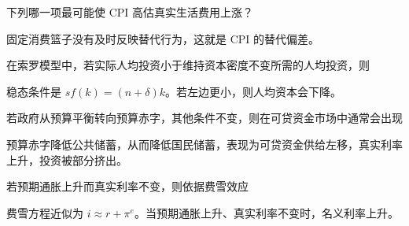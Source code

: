 \begin{question}
下列哪一项最可能使 CPI 高估真实生活费用上涨？
\begin{choiceoptions}[2]
\end{choiceoptions}
\begin{solution}
固定消费篮子没有及时反映替代行为，这就是 CPI 的替代偏差。
\end{solution}
\end{question}

\begin{question}
在索罗模型中，若实际人均投资小于维持资本密度不变所需的人均投资，则
\begin{choiceoptions}[2]
\end{choiceoptions}
\begin{solution}
稳态条件是 $sf(k)=(n+\delta)k$。若左边更小，则人均资本会下降。
\end{solution}
\end{question}

\begin{question}
若政府从预算平衡转向预算赤字，其他条件不变，则在可贷资金市场中通常会出现
\begin{choiceoptions}[2]
\end{choiceoptions}
\begin{solution}
预算赤字降低公共储蓄，从而降低国民储蓄，表现为可贷资金供给左移，真实利率上升，投资被部分挤出。
\end{solution}
\end{question}

\begin{question}
若预期通胀上升而真实利率不变，则依据费雪效应
\begin{choiceoptions}[2]
\end{choiceoptions}
\begin{solution}
费雪方程近似为 $i\approx r+\pi^e$。当预期通胀上升、真实利率不变时，名义利率上升。
\end{solution}
\end{question}

